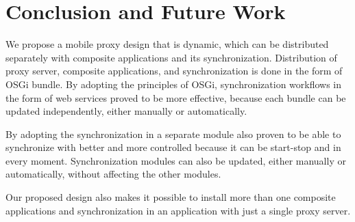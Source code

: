 \documentclass[conference]{IEEEtran}
\begin{document}




\section{Conclusion and Future Work}
We propose a mobile proxy design that is dynamic, which can be distributed separately with composite applications and its synchronization. Distribution of proxy server, composite applications, and synchronization is done in the form of OSGi bundle. By adopting the principles of OSGi, synchronization workflows in the form of web services proved to be more effective, because each bundle can be updated independently, either manually or automatically.

By adopting the synchronization in a separate module also proven to be able to synchronize with better and more controlled because it can be start-stop and in every moment. Synchronization modules can also be updated, either manually or automatically, without affecting the other modules.

Our proposed design also makes it possible to install more than one composite applications and synchronization in an application with just a single proxy server.











\end{document}
